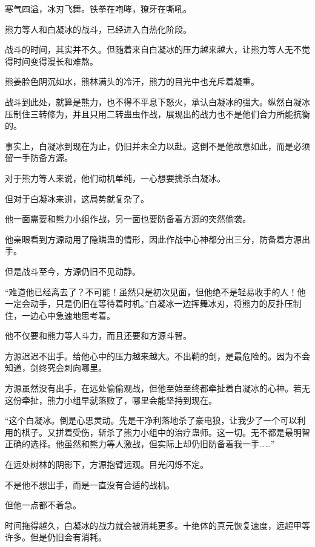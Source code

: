 
\begin{this_body}

寒气四溢，冰刃飞舞。铁拳在咆哮，獠牙在嘶吼。

熊力等人和白凝冰的战斗，已经进入白热化阶段。

战斗的时间，其实并不久。但随着来自白凝冰的压力越来越大，让熊力等人无不觉得时间变得漫长和难熬。

熊姜脸色阴沉如水，熊林满头的冷汗，熊力的目光中也充斥着凝重。

战斗到此处，就算是熊力，也不得不平息下怒火，承认白凝冰的强大。纵然白凝冰压制住三转修为，并且只用二转蛊虫作战，展现出的战力也不是他们合力所能抗衡的。

事实上，白凝冰到现在为止，仍旧并未全力以赴。这倒不是他故意如此，而是必须留一手防备方源。

对于熊力等人来说，他们动机单纯，一心想要擒杀白凝冰。

但对于白凝冰来讲，这局势就复杂了。

他一面需要和熊力小组作战，另一面也要防备着方源的突然偷袭。

他亲眼看到方源动用了隐鳞蛊的情形，因此作战中心神都分出三分，防备着方源出手。

但是战斗至今，方源仍旧不见动静。

“难道他已经离去了？不可能！虽然只是初次见面，但他绝不是轻易收手的人！他一定会动手，只是仍旧在等待着时机。”白凝冰一边挥舞冰刃，将熊力的反扑压制住，一边心中急速地思考着。

他不仅要和熊力等人斗力，而且还要和方源斗智。

方源迟迟不出手。给他心中的压力越来越大。不出鞘的剑，是最危险的。因为不会知道，剑终究会刺向哪里。

方源虽然没有出手，在远处偷偷观战，但他至始至终都牵扯着白凝冰的心神。若无这份牵扯，熊力小组早就落败了，哪里会能坚持到现在。

“这个白凝冰。倒是心思灵动。先是干净利落地杀了豪电狼，让我少了一个可以利用的棋子。又拼着受伤，斩杀了熊力小组中的治疗蛊师。这一切。无不都是最明智正确的选择。他虽然和熊力等人激战，但实际上却仍旧防备着我一手……”

在远处树林的阴影下，方源抱臂远观。目光闪烁不定。

不是他不想出手，而是一直没有合适的战机。

但他一点都不着急。

时间拖得越久，白凝冰的战力就会被消耗更多。十绝体的真元恢复速度，远超甲等许多。但是仍旧会有消耗。


\end{this_body}
